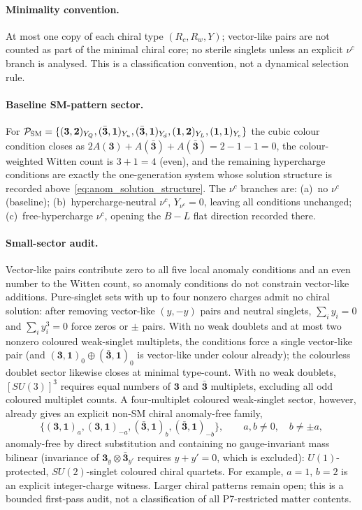 \paragraph{Minimality convention.}
At most one copy of each chiral type $(R_c,R_w,Y)$; vector-like
pairs are not counted as part of the minimal chiral core; no
sterile singlets unless an explicit $\nu^c$ branch is analysed.
This is a classification convention, not a dynamical selection
rule.

\paragraph{Baseline SM-pattern sector.}
For
$\mathcal P_{\rm SM}=
\{(\mathbf 3,\mathbf 2)_{Y_Q},(\bar{\mathbf 3},\mathbf 1)_{Y_u},
(\bar{\mathbf 3},\mathbf 1)_{Y_d},(\mathbf 1,\mathbf 2)_{Y_L},
(\mathbf 1,\mathbf 1)_{Y_e}\}$
the cubic colour condition closes as
$2A(\mathbf 3)+A(\bar{\mathbf 3})+A(\bar{\mathbf 3})=2-1-1=0$,
the colour-weighted Witten count is $3+1=4$ (even), and the
remaining hypercharge conditions are exactly the one-generation
system whose solution structure is recorded
above~\eqref{eq:anom_solution_structure}.
The $\nu^c$ branches are: (a)~no $\nu^c$ (baseline);
(b)~hypercharge-neutral $\nu^c$, $Y_{\nu^c}=0$, leaving all
conditions unchanged; (c)~free-hypercharge $\nu^c$, opening the
$B-L$ flat direction recorded there.

\paragraph{Small-sector audit.}
Vector-like pairs contribute zero to all five local anomaly
conditions and an even number to the Witten count, so anomaly
conditions do not constrain vector-like additions.
Pure-singlet sets with up to four nonzero charges admit no chiral
solution: after removing vector-like $(y,-y)$ pairs and neutral
singlets, $\sum_i y_i=0$ and $\sum_i y_i^3=0$ force zeros or
$\pm$ pairs.
With no weak doublets and at most two nonzero coloured
weak-singlet multiplets, the conditions force a single vector-like
pair (and $(\mathbf 3,\mathbf 1)_0\oplus(\bar{\mathbf 3},\mathbf 1)_0$
is vector-like under colour already); the colourless doublet
sector likewise closes at minimal type-count.
With no weak doublets, $[SU(3)]^3$ requires equal numbers of
$\mathbf 3$ and $\bar{\mathbf 3}$ multiplets, excluding all odd
coloured multiplet counts.
A four-multiplet coloured weak-singlet sector, however, already
gives an explicit non-SM chiral anomaly-free family,
\[
\{(\mathbf 3,\mathbf 1)_{a},(\mathbf 3,\mathbf 1)_{-a},
(\bar{\mathbf 3},\mathbf 1)_{b},(\bar{\mathbf 3},\mathbf 1)_{-b}\},
\qquad a,b\neq0,\quad b\neq\pm a ,
\]
anomaly-free by direct substitution and containing no
gauge-invariant mass bilinear (invariance of
$\mathbf 3_{y}\otimes\bar{\mathbf 3}_{y'}$ requires $y+y'=0$,
which is excluded): $U(1)$-protected, $SU(2)$-singlet coloured
chiral quartets.
For example, $a=1$, $b=2$ is an explicit integer-charge witness.
Larger chiral patterns remain open; this is a bounded first-pass
audit, not a classification of all P7-restricted matter contents.

